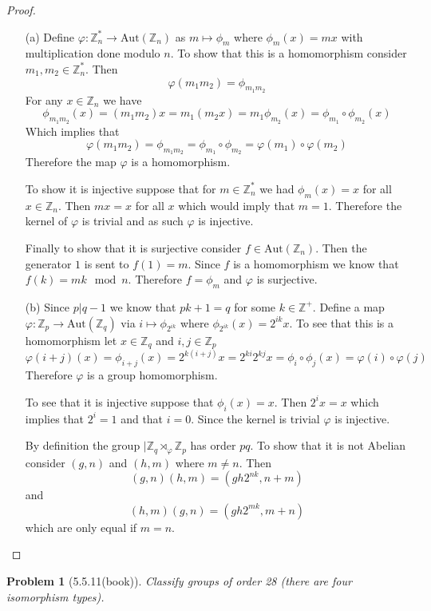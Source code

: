\documentclass[10pt]{article}
\newcommand{\sk}{\vskip 10mm}
\newcommand{\bb}[1]{\mathbb{#1}}
\theoremstyle{plain}
\newtheorem{problem}{Problem}
\theoremstyle{remark}
\begin{document}
\begin{proof}
  \begin{enumerate}
  \item[(a)] Define $\varphi:\bb{Z}_n^*\rightarrow \text{Aut}(\bb{Z}_n)$ as $m\mapsto \phi_m$ where $\phi_m(x)=mx$
    with multiplication done modulo $n$. To show that this is a homomorphism
    consider $m_1,m_2\in\bb{Z}_n^*$. Then
    \[ \varphi(m_1m_2)= \phi_{m_1m_2}\]
    For any $x\in \bb{Z}_n$ we have
    \[ \phi_{m_1m_2}(x)=(m_1m_2)x=m_1(m_2x)=m_1\phi_{m_2}(x)=\phi_{m_1}\circ\phi_{m_2}(x) \]
    Which implies that
    \[ \varphi(m_1m_2)=\phi_{m_1m_2}=\phi_{m_1}\circ\phi_{m_2}=\varphi(m_1)\circ\varphi(m_2) \]
    Therefore the map $\varphi$ is a homomorphism.

    To show it is injective suppose that for $m\in\bb{Z}_n^*$ we had
    $\phi_m(x)=x$ for all $x\in\bb{Z}_n$. Then $mx=x$ for
    all $x$ which would imply that $m=1$. Therefore the kernel
    of $\varphi$ is trivial and as such $\varphi$ is injective.

    Finally to show that it is surjective consider $f\in \text{Aut}(\bb{Z}_n)$. Then
    the generator $1$ is sent to $f(1)=m$. Since $f$ is a homomorphism we know that
    $f(k)=mk\mod n$. Therefore $f=\phi_m$ and $\varphi$ is surjective.
  \item[(b)] Since $p|q-1$ we know that $pk+1=q$ for some
    $k\in\bb{Z}^+$. Define a map $\varphi:\bb{Z}_p\rightarrow \text{Aut}(\bb{Z}_q)$ via
    $i\mapsto \phi_{2^{ik}}$ where $\phi_{2^{ik}}(x)=2^{ik}x$. To see that this is a
    homomorphism let $x\in \bb{Z}_q$ and $i,j\in \bb{Z}_p$
    \[ \varphi(i+j)(x)=\phi_{i+j}(x)=2^{k(i+j)}x=2^{ki}2^{kj}x=\phi_{i}\circ\phi_j(x)=\varphi(i)\circ\varphi(j) \]
    Therefore $\varphi$ is a group homomorphism.

    To see that it is injective suppose that $\phi_i(x)=x$. Then
    $2^ix=x$ which implies that $2^i=1$ and that $i=0$. Since
    the kernel is trivial $\varphi$ is injective.

    By definition the group $|\bb{Z}_q\rtimes_\varphi\bb{Z}_p$ has order $pq$.
    To show that it is not Abelian consider $(g,n)$ and $(h,m)$ where
    $m\neq n$. Then
    \[ (g,n)(h,m)=(gh2^{nk},n+m)\]
    and
    \[ (h,m)(g,n)=(gh2^{mk},m+n)\]
    which are only equal if $m=n$.
  \end{enumerate}
\end{proof}

\sk

\begin{problem}[5.5.11(book)]
  Classify groups of order 28 (there are four isomorphism types).
\end{problem}
\end{document}
